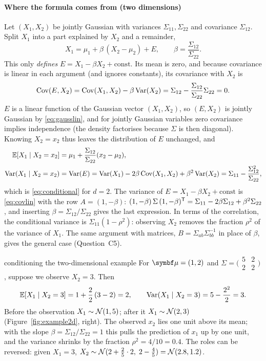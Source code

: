 \documentclass[11pt]{article}
\begin{document}
\paragraph{Where the formula comes from (two dimensions)} Let $(X_1, X_2)$ be jointly Gaussian with variances
$\Sigma_{11}, \Sigma_{22}$ and covariance $\Sigma_{12}$. Split $X_1$ into a part explained by $X_2$ and a remainder,
\[
  X_1 = \mu_1 + \beta\,(X_2 - \mu_2) + E, \qquad \beta = \frac{\Sigma_{12}}{\Sigma_{22}} .
\]
This only \emph{defines} $E = X_1 - \beta X_2 + \text{const}$. Its mean is zero, and because covariance is linear
in each argument (and ignores constants), its covariance with $X_2$ is
\[
  \operatorname{Cov}(E, X_2) = \operatorname{Cov}(X_1, X_2) - \beta\operatorname{Var}(X_2) = \Sigma_{12} - \frac{\Sigma_{12}}{\Sigma_{22}}\Sigma_{22} = 0 .
\]
$E$ is a linear function of the Gaussian vector $(X_1, X_2)$, so $(E, X_2)$ is jointly Gaussian by \eqref{eq:gausslin}, and for jointly Gaussian variables
zero covariance implies independence (the density factorises because $\Sigma$ is then diagonal). Knowing $X_2 = x_2$
thus leaves the distribution of $E$ unchanged, and
\begin{align*}
  \mathbb{E}[X_1 \mid X_2 = x_2] &= \mu_1 + \frac{\Sigma_{12}}{\Sigma_{22}}(x_2 - \mu_2), \\
  \operatorname{Var}(X_1 \mid X_2 = x_2) &= \operatorname{Var}(E) = \operatorname{Var}(X_1) - 2\beta\operatorname{Cov}(X_1, X_2) + \beta^2\operatorname{Var}(X_2)
  = \Sigma_{11} - \frac{\Sigma_{12}^2}{\Sigma_{22}} ,
\end{align*}
which is \eqref{eq:conditional} for $d = 2$. The variance of $E = X_1 - \beta X_2 + \text{const}$ is
\eqref{eq:covlin} with the row $A = (1, -\beta)$: $(1, -\beta)\,\Sigma\,(1, -\beta)^{\mathsf{T}} = \Sigma_{11} - 2\beta\Sigma_{12}
+ \beta^2\Sigma_{22}$, and inserting $\beta = \Sigma_{12}/\Sigma_{22}$ gives the last expression. In terms of the correlation, the conditional variance is
$\Sigma_{11}(1 - \rho^2)$: observing $X_2$ removes the fraction $\rho^2$ of the variance of $X_1$. The same argument
with matrices, $B = \Sigma_{ab}\Sigma_{bb}^{-1}$ in place of $\beta$, gives the general case (Question~C5).

\begin{worked}{conditioning the two-dimensional example}
For $\vmu = (1, 2)$ and $\Sigma = \bigl(\begin{smallmatrix} 5 & 2 \\ 2 & 2\end{smallmatrix}\bigr)$, suppose we observe $X_2 = 3$. Then
\[
  \mathbb{E}[X_1 \mid X_2 = 3] = 1 + \frac{2}{2}\,(3 - 2) = 2, \qquad
  \operatorname{Var}(X_1 \mid X_2 = 3) = 5 - \frac{2^2}{2} = 3 .
\]
Before the observation $X_1 \sim \mathcal{N}(1, 5)$; after it $X_1 \sim \mathcal{N}(2, 3)$ (Figure~\ref{fig:example2d}, right).
The observed $x_2$ lies one unit above its mean; with the slope $\beta = \Sigma_{12}/\Sigma_{22} = 1$ this pulls the
prediction of $x_1$ up by one unit, and the variance shrinks by the fraction $\rho^2 = 4/10 = 0.4$. The roles can be reversed: given $X_1 = 3$,
$X_2 \sim \mathcal{N}(2 + \frac25 \cdot 2, \; 2 - \frac45) = \mathcal{N}(2.8, 1.2)$.
\end{worked}
\end{document}
